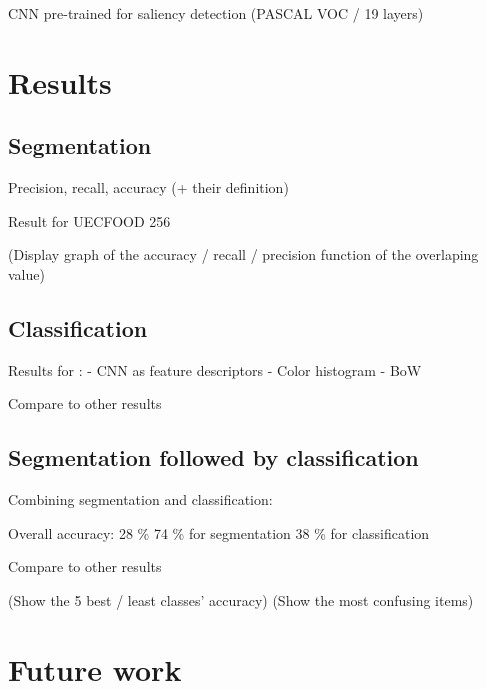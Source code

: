 \documentclass[aspectratio=169]{beamer}
\let\oldsection\section
\renewcommand{\section}[1]{
    \oldsection{#1}	
    \subsection{}
}
\newenvironment{myframe}[1][t]{\begin{frame}[#1]{\secname}{\subsecname}}{\end{frame}}
\begin{document}
    \begin{myframe}
        CNN pre-trained for saliency detection (PASCAL VOC / 19 layers)
    \end{myframe}
    
    \section{Results}
    
    \subsection{Segmentation}
    
    \begin{myframe}
        Precision, recall, accuracy (+ their definition)
        
        Result for UECFOOD 256
        
        (Display graph of the accuracy / recall / precision function of the overlaping value)
    \end{myframe}
    
    \subsection{Classification}
    
    \begin{myframe}
        Results for :
        - CNN as feature descriptors
        - Color histogram
        - BoW
        
        Compare to other results
    \end{myframe}
    
    \subsection{Segmentation followed by classification}
    
    \begin{myframe}
        Combining segmentation and classification:
        
        Overall accuracy: 28 \%
        74 \% for segmentation
        38 \% for classification

        Compare to other results
        
        (Show the 5 best / least classes' accuracy)
        (Show the most confusing items)
    \end{myframe}
    
    \section{Future work}
    
\end{document}
